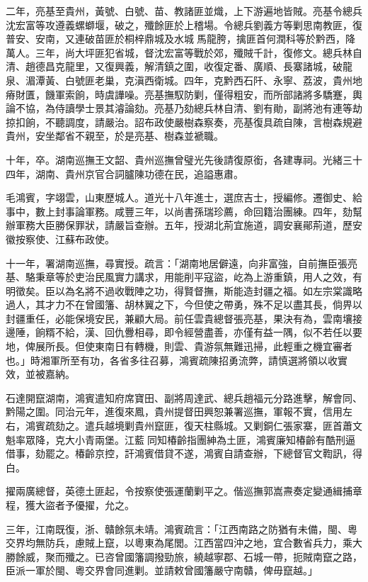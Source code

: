 \begin{pinyinscope}
二年，亮基至貴州，黃號、白號、苗、教諸匪並熾，上下游遍地皆賊。亮基令總兵沈宏富等攻遵義螺螄堰，破之，殲餘匪於上稽場。令總兵劉義方等剿思南教匪，復普安、安南，又連破苗匪於桐梓鼎城及水城馬龍胯，擒匪首何潤科等於黔西，降萬人。三年，尚大坪匪犯省城，督沈宏富等戰於郊，殲賊千計，復修文。總兵林自清、趙德昌克龍里，又復興義，解清鎮之圍，收復定番、廣順、長寨諸城，破龍泉、湄潭黃、白號匪老巢，克滇西衛城。四年，克黔西石阡、永寧、荔波，貴州地瘠財匱，饑軍索餉，時虞譁噪。亮基撫馭防剿，僅得粗安，而所部諸將多驕蹇，輿論不協，為侍讀學士景其濬論劾。亮基乃劾總兵林自清、劉有勛，副將池有連等劫掠扣餉，不聽調度，請嚴治。詔布政使嚴樹森察奏，亮基復具疏自陳，言樹森規避貴州，安坐鄰省不親至，於是亮基、樹森並褫職。

十年，卒。湖南巡撫王文韶、貴州巡撫曾璧光先後請復原銜，各建專祠。光緒三十四年，湖南、貴州京官合詞臚陳功德在民，追謚惠肅。

毛鴻賓，字翊雲，山東歷城人。道光十八年進士，選庶吉士，授編修。遷御史、給事中，數上封事論軍務。咸豐三年，以尚書孫瑞珍薦，命回籍治團練。四年，劾幫辦軍務大臣勝保罪狀，請嚴旨查辦。五年，授湖北荊宜施道，調安襄鄖荊道，歷安徽按察使、江蘇布政使。

十一年，署湖南巡撫，尋實授。疏言：「湖南地居僻遠，向非富強，自前撫臣張亮基、駱秉章等於吏治民風實力講求，用能削平寇盜，屹為上游重鎮，用人之效，有明徵矣。臣以為名將不過收戰陣之功，得賢督撫，斯能造封疆之福。如左宗棠識略過人，其才力不在曾國籓、胡林翼之下，今但使之帶勇，殊不足以盡其長，倘畀以封疆重任，必能保境安民，兼顧大局。前任雲貴總督張亮基，果決有為，雲南壤接邊陲，餉糈不給，漢、回仇釁相尋，即令經營盡善，亦僅有益一隅，似不若任以要地，俾展所長。但使東南日有轉機，則雲、貴游氛無難迅掃，此輕重之機宜審者也。」時湘軍所至有功，各省多往召募，鴻賓疏陳招勇流弊，請慎選將領以收實效，並被嘉納。

石達開竄湖南，鴻賓遣知府席寶田、副將周達武、總兵趙福元分路進擊，解會同、黔陽之圍。同治元年，進復來鳳，貴州提督田興恕兼署巡撫，軍報不實，信用左右，鴻賓疏劾之。遣兵越境剿貴州竄匪，復天柱縣城。又剿銅仁張家寨，匪首蕭文魁率眾降，克大小青兩堡。江藍同知椿齡指團紳為土匪，鴻賓廉知椿齡有酷刑逼借事，劾罷之。椿齡京控，訐鴻賓借貸不遂，鴻賓自請查辦，下總督官文鞫訊，得白。

擢兩廣總督，英德土匪起，令按察使張運蘭剿平之。偕巡撫郭嵩燾奏定變通緝捕章程，獲大盜者予優擢，允之。

三年，江南既復，浙、贛餘氛未靖。鴻賓疏言：「江西南路之防猶有未備，閩、粵交界均無防兵，慮賊上竄，以粵東為尾閭。江西當四沖之地，宜合數省兵力，乘大勝餘威，聚而殲之。已咨曾國籓調撥勁旅，繞越寧郡、石城一帶，扼賊南竄之路，臣派一軍於閩、粵交界會同進剿。並請敕曾國籓嚴守南贛，俾毋竄越。」


\end{pinyinscope}
